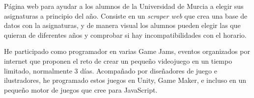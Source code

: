 \documentclass[letterpaper]{deedy-resume} %
\begin{document}
\begin{minipage}[t]{0.66\textwidth}

Página web para ayudar a los alumnos de la Universidad de Murcia a elegir sus asignaturas a principio del año. Consiste en un \textit{scraper web} que crea una base de datos con la asignaturas, y de manera visual los alumnos pueden elegir las que quieran de diferentes años y comprobar si hay incompatibilidades con el horario.

\sectionspace



He participado como programador en varias Game Jams, eventos organizados por internet que proponen el reto de crear un pequeño videojuego en un tiempo limitado, normalmente 3 días. Acompañado por diseñadores de juego e ilustradores, he programado estos juegos en Unity, Game Maker, e incluso en un pequeño motor de juegos que cree para JavaScript.

\sectionspace










\end{minipage} %
\end{document}
